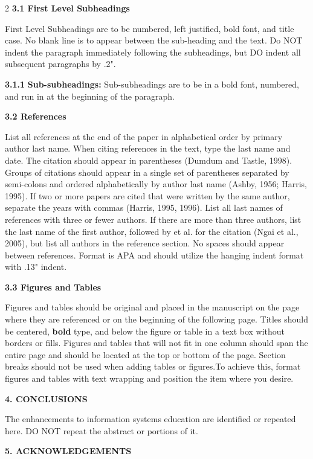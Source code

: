 \documentclass[9pt]{article}
\begin{document}
\begin{multicols}{2}
\textbf{3.1 First Level Subheadings}

First Level Subheadings are to be numbered, left justified, bold font, and title
case. No blank line is to appear between the sub-heading and the text. Do NOT
indent the paragraph immediately following the subheadings, but DO indent all
subsequent paragraphs by .2".

\textbf{3.1.1} \textbf{Sub-subheadings: }Sub-subheadings are to be in a bold
font, numbered, and run in at the beginning of the paragraph.

\textbf{3.2 References}

List all references at the end of the paper in alphabetical order by primary
author last name. When citing references in the text, type the last name and
date. The citation should appear in parentheses (Dumdum and Tastle, 1998). Groups
of citations should appear in a single set of parentheses separated by
semi-colons and ordered alphabetically by author last name (Ashby, 1956; Harris,
1995). If two or more papers are cited that were written by the same author,
separate the years with commas (Harris, 1995, 1996). List all last names of
references with three or fewer authors. If there are more than three authors,
list the last name of the first author, followed by et al. for the citation (Ngai
et al., 2005), but list all authors in the reference section. No spaces should
appear between references. Format is APA and should utilize the hanging indent
format with .13" indent.

\textbf{3.3 Figures and Tables}

Figures and tables should be original and placed in the manuscript on the page
where they are referenced or on the beginning of the following page. Titles
should be centered, \textbf{bold} type, and below the figure or table in a text
box without borders or fills. Figures and tables that will not fit in one column
should span the entire page and should be located at the top or bottom of the
page. Section breaks should not be used when adding tables or
figures.\texttt{{\large  }}To achieve this, format figures and tables with text
wrapping and position the item where you desire.

\begin{center}
\textbf{4. CONCLUSIONS}
\end{center}

The enhancements to information systems education are identified or repeated
here. DO NOT repeat the abstract or portions of it.

\begin{center}
\textbf{5. ACKNOWLEDGEMENTS}
\end{center}


\end{multicols}
\end{document}
